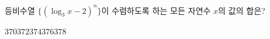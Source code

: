 등비수열 $\{(\log_3 x-2)^n\}$이 수렴하도록 하는 모든 자연수 $x$의 값의 합은?
\begin{choices32}{$370$}{$372$}{$374$}{$376$}{$378$}\end{choices32}
